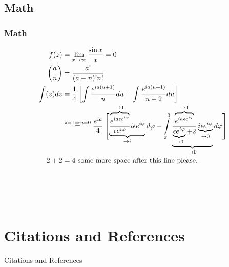 \subsection{Math}




\begin{frame}
	\frametitle{Math}
	\begin{align}
			 f(z) &= 
			 	\lim\limits_{x\rightarrow \infty} \frac{\sin x}{x} = 0\\
		 	 \binom{a}{n} &= 
		 	 	\frac{a!}{(a-n)! n!}\\
		 	 \nonumber \int(z) dz &=  
		 	 	\frac14 \left[ \int\frac{e^{ia(u + 1)}}{u} du - \int\frac{e^{ia(u + 1)}}{u + 2}du   \right]\\[1em]
		 	 & \overset{z = 1 \Rightarrow u = 0}=  
		 	 	\frac{e^{i a}}{4} \left[\vphantom{ \int\limits_{\pi}^0} \smash{ \underbrace{\frac{\overbrace{e^{ia \epsilon e^{i \varphi}}}^{\rightarrow 1}} {\epsilon e^{i \varphi}} i \epsilon e^{i \varphi}}_{\rightarrow i}  d \varphi            - \int\limits_{\pi}^0 \underbrace{\frac{\overbrace{e^{ia \epsilon e^{i \varphi}}}^{\rightarrow 1}} {\underbrace{\epsilon e^{i \varphi}}_{\rightarrow 0} + 2} \underbrace{i \epsilon e^{i \varphi}}_{\rightarrow 0}}_{\rightarrow 0}  d \varphi  }\right]\\[2em]
		 	 2 + 2 &= 4 \ \text{some more space after this line please.}\\[4em]\nonumber
	\end{align}
\end{frame}













\section{Citations and References}


\begin{frame}{Citations and References}
    \cite{AHF}
    
    \parencite{AMR}
    
    \renewcommand*{\bibfont}{\footnotesize}
    \printbibliography[]    
\end{frame}








